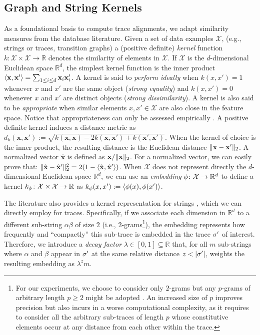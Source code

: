 \subsection{Graph and String Kernels}\label{subsec:katk}
As a foundational basis to compute trace alignments, we adapt similarity measures from the database literature.  Given a set of data examples $\mathcal{X}$, (e.g., strings or traces, transition graphs) a (positive definite) \emph{kernel} function $k\colon \mathcal{X}\times \mathcal{X}\to \mathbb{R}$ denotes the similarity of elements in $\mathcal{X}$. If $\mathcal{X}$ is the $d$-dimensional Euclidean space $\mathbb{R}^d$, the simplest kernel function is the inner product $\Braket{\mathbf{x},\mathbf{x}'}=\sum_{1\leq i\leq d}\mathbf{x}_i\mathbf{x}'_i$.
A kernel is said to \emph{perform ideally} \cite{Gartner03} when $k(x,x')=1$ whenever $x$ and $x'$ are the same object (\textit{strong equality}) and $k(x,x')=0$ whenever $x$ and $x'$ are distinct objects (\textit{strong dissimilarity}). A kernel is also said to be \emph{appropriate} when similar elements $x,x'\in\mathcal{X}$ are also close in the feature space. Notice that appropriateness can only be assessed empirically \cite{Gartner03}.
A positive definite kernel induces a distance metric as
$
d_k(\mathbf{x},\mathbf{x}'):=\sqrt{k(\mathbf{x},\mathbf{x})-2k(\mathbf{x},\mathbf{x}')+k(\mathbf{x}',\mathbf{x}')}
$.
When the kernel of choice is the inner product, the resulting distance is the Euclidean distance $\|\mathbf{x}-\mathbf{x}'\|_{2}$. A normalized vector $\hat{\mathbf{x}}$ is defined as $\mathbf{x}/\|\mathbf{x}\|_{2}$. For a normalized vector, we can easily prove that: $\|\hat{\mathbf{x}}-\hat{\mathbf{x}}'\|_{2}^2=2(1-\Braket{\hat{\mathbf{x}},\hat{\mathbf{x}}'})$.
When $\mathcal{X}$ does not represent directly the $d$-dimensional Euclidean space $\mathbb{R}^d$, we can use an \emph{embedding} $\phi\colon\mathcal{X}\to \mathbb{R}^d$ to define a kernel $k_\phi\colon \mathcal{X}\times \mathcal{X}\to\mathbb{R}$ as $k_\phi(x,x'):=\Braket{\phi(x),\phi(x')}$.



The literature also provides a kernel representation for strings \cite{GartnerFW03}, which we can directly employ for traces. Specifically, if we associate each dimension in $\mathbb{R}^d$ to a different sub-string $\alpha\beta$ of size $2$ (i.e., $2$-grams\footnote{\label{fn:caveat}For our experiments, we choose to consider only $2$-grams but any $p$-grams of arbitrary length $p\geq 2$ might be adopted \cite{Gartner03}. An increased size of $p$ improves precision but also incurs in a worse computational complexity, as it requires to consider all the arbitrary sub-traces of length $p$ whose constitutive elements occur at any distance from each other within the trace.}), the embedding represents how frequently and ``compactly'' this sub-trace is embedded in the trace $\sigma'$ of interest. Therefore, we introduce a \emph{decay factor} $\lambda\in[0,1]\subseteq\mathbb{R}$ that, for all $m$ sub-strings where $\alpha$ and $\beta$ appear in $\sigma'$ at the same relative distance $z < |\sigma'|$, weights the resulting embedding as $\lambda^zm$.



